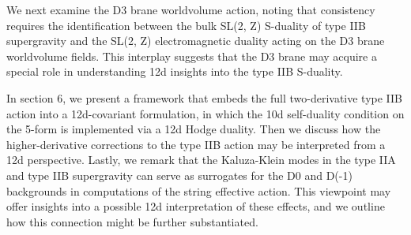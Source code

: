We next examine the D3 brane worldvolume action, noting that consistency requires the identification between the bulk SL(2, Z) S-duality of type IIB supergravity and the SL(2, Z) electromagnetic duality acting on the D3 brane worldvolume fields.
This interplay suggests that the D3 brane may acquire a special role in understanding 12d insights into the type IIB S-duality. 

In section 6, we present a framework that embeds the full two-derivative type IIB action into a 12d-covariant formulation, in which the 10d self-duality condition on the 5-form is implemented via a 12d Hodge duality.
Then we discuss how the higher-derivative corrections to the type IIB action may be interpreted from a 12d perspective.
Lastly, we remark that the Kaluza-Klein modes in the type IIA and type IIB supergravity can serve as surrogates for the D0 and D(-1) backgrounds in computations of the string effective action.
This viewpoint may offer insights into a possible 12d interpretation of these effects, and we outline how this connection might be further substantiated.